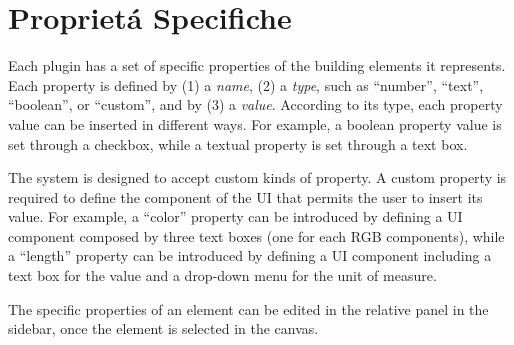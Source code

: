 \section{Propriet\'a Specifiche}
\label{sec:chapter_3_section_3}

\noindent
Each plugin has a set of specific properties of the building elements it represents.
Each property is defined by (1) a \emph{name}, (2) a \emph{type}, such as ``number'', ``text'', ``boolean'', or ``custom'', and by  (3) a \emph{value}.
According to its type, each property value can be inserted in different ways.
For example, a boolean property value is set through a checkbox, while a textual property is set through a text box.

The system is designed to accept custom kinds of property. A custom property is required to define the component of the UI that permits the user to insert its value.
For example, a ``color'' property can be introduced by defining a UI component composed by three text boxes (one for each RGB components), while a ``length'' property can be introduced by defining a UI component including a text box for the value and a drop-down menu for the unit of measure.

The specific properties of an element can be edited in the relative panel in the sidebar, once the element is selected in the canvas.
